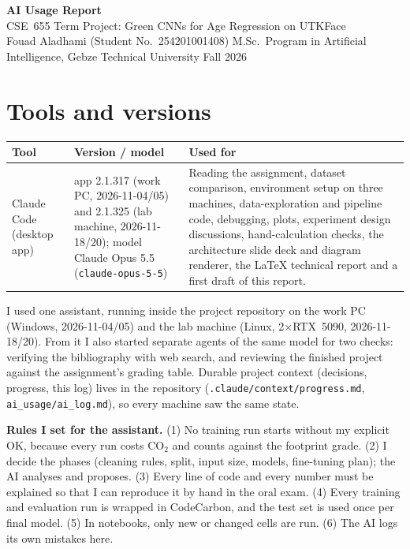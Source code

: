 \documentclass[10pt,a4paper]{article}
\newcommand{\cotwo}{CO$_2$}
\begin{document}
\begin{center}
{\Large\bfseries AI Usage Report}\\[3pt]
CSE~655 Term Project: Green CNNs for Age Regression on UTKFace\\[2pt]
Fouad Aladhami (Student No.\ 254201001408) \quad M.Sc.\ Program in Artificial Intelligence, Gebze Technical University \quad Fall 2026
\end{center}

\section{Tools and versions}
\begin{tabularx}{\textwidth}{@{}p{3.2cm} p{4.3cm} L@{}}
\toprule
Tool & Version / model & Used for \\
\midrule
Claude Code (desktop app) & app 2.1.317 (work PC, 2026-11-04/05) and 2.1.325 (lab machine, 2026-11-18/20); model Claude Opus 5.5 (\texttt{claude-opus-5-5}) & Reading the assignment, dataset comparison, environment setup on three machines, data-exploration and pipeline code, debugging, plots, experiment design discussions, hand-calculation checks, the architecture slide deck and diagram renderer, the \LaTeX{} technical report and a first draft of this report. \\
\bottomrule
\end{tabularx}

\smallskip
\noindent I used one assistant, running inside the project repository on the work PC (Windows, 2026-11-04/05) and the lab machine (Linux, 2$\times$RTX~5090, 2026-11-18/20). From it I also started separate agents of the same model for two checks: verifying the bibliography with web search, and reviewing the finished project against the assignment's grading table. Durable project context (decisions, progress, this log) lives in the repository (\texttt{.claude/context/progress.md}, \texttt{ai\_usage/ai\_log.md}), so every machine saw the same state.

\textbf{Rules I set for the assistant.} (1) No training run starts without my explicit OK, because every run costs \cotwo{} and counts against the footprint grade. (2) I decide the phases (cleaning rules, split, input size, models, fine-tuning plan); the AI analyses and proposes. (3) Every line of code and every number must be explained so that I can reproduce it by hand in the oral exam. (4) Every training and evaluation run is wrapped in CodeCarbon, and the test set is used once per final model. (5) In notebooks, only new or changed cells are run. (6) The AI logs its own mistakes here.
\end{document}
